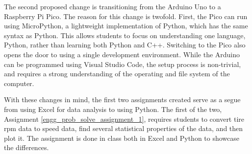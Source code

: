 The second proposed change is transitioning from the Arduino Uno to a Raspberry Pi Pico. The reason for this 
change is twofold. First, the Pico can run using MicroPython, a lightweight implementation of Python, which has 
the same syntax as Python. This allows students to focus on understanding one language, Python, rather than 
learning both Python and C++. Switching to the Pico also opens the door to using a single development environment. 
While the Arduino can be programmed using Visual Studio Code, the setup process is non-trivial, and requires a 
strong understanding of the operating and file system of the computer. 

With these changes in mind, the first two assignments created serve as a segue from using Excel for data analysis to 
using Python. The first of the two, Assignment \ref{engg_prob_solve_assignment_1}, requires students to convert 
tire rpm data to speed data, find several statistical properties of the data, and then plot it. The assignment
is done in class both in Excel and Python to showcase the differences.

\label{engg_prob_solve_assignment_1}

